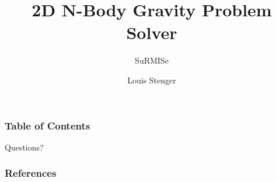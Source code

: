 \documentclass[11pt]{beamer}
\begin{document}
	\author{Louis Stenger}
	\title{2D N-Body Gravity Problem Solver}
	\subtitle{SuRMISe}
	\date{}
	\begin{frame}
		\maketitle
	\end{frame}
	
	\begin{frame}
		\frametitle{Table of Contents}
		\tableofcontents
	\end{frame}
	
	
	
	
	\begin{frame}[standout]
		Questions?
	\end{frame}
	\begin{frame}[t,allowframebreaks]
		\frametitle{References}
		\printbibliography
	\end{frame}
	
\end{document}
